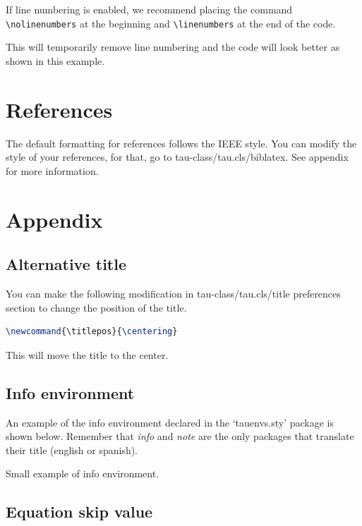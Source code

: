 \documentclass[9pt,a4paper,twoside]{tau-class/tau}
\begin{document}
    If line numbering is enabled, we recommend placing the command \verb|\nolinenumbers| at the beginning and \verb|\linenumbers| at the end of the code. 
	
    This will temporarily remove line numbering and the code will look better as shown in this example.
	
\section{References}

    The default formatting for references follows the IEEE style. 
    You can modify the style of your references, for that, go to tau-class/tau.cls/biblatex. 
    See appendix for more information.
	
\section{Appendix}

    \subsection{Alternative title}

        You can make the following modification in tau-class/tau.cls/title preferences section to change the position of the title.

\nolinenumbers
\begin{lstlisting}[language=TeX, caption=Alternative title.]
\newcommand{\titlepos}{\centering}
\end{lstlisting}
\linenumbers

	This will move the title to the center. 

    \subsection{Info environment}

        An example of the info environment declared in the ‘tauenvs.sty’ package is shown below. Remember that \textit{info} and \textit{note} are the only packages that translate their title (english or spanish).
		
	\begin{info}
		Small example of info environment.
	\end{info}

    \subsection{Equation skip value}
\end{document}
